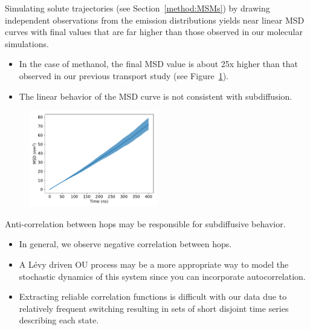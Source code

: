 \documentclass{article}
\begin{document}
  Simulating solute trajectories (see Section~\ref{method:MSMs}) by drawing independent  
  observations from the emission distributions yields near linear MSD curves
  with final values that are far higher than those observed in our molecular simulations.
  \begin{itemize}
    \item In the case of methanol, the final MSD value is about 25x higher than that observed in our
    previous transport study (see Figure~\ref{fig:msd_MET}).
    \item The linear behavior of the MSD curve is not consistent with subdiffusion.
  \end{itemize}
  \begin{figure}[!h]
  \centering
  \includegraphics[width=0.5\textwidth]{MET_msd.pdf}
  \caption{}\label{fig:msd_MET}
  \end{figure}
  
  \noindent Anti-correlation between hops may be responsible for subdiffusive behavior.
  \begin{itemize}
    \item In general, we observe negative correlation between hops.
    \item A L\'evy driven OU process may be a more appropriate way to model
    the stochastic dynamics of this system since you can incorporate autocorrelation.
    \item Extracting reliable correlation functions is difficult with our data
    due to relatively frequent switching resulting in sets of short disjoint time 
    series describing each state.
  \end{itemize}
\end{document}
